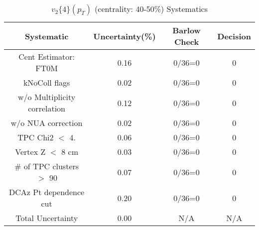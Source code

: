 \begin{table}[htbp]
\caption{$v_2\{4\}(p_{T})$ (centrality: 40-50\%) Systematics}
\label{tab:Sys_pTDiffv24ChFull}
\centering
\begin{tabular}{|c|c|c|c|}
\hline
Systematic & Uncertainty(\%) & Barlow Check & Decision \\
\hline
Cent Estimator: FT0M & 0.16 & 0/36=0 & 0 \\
kNoColl flags & 0.02 & 0/36=0 & 0 \\
w/o Multiplicity correlation & 0.12 & 0/36=0 & 0 \\
w/o NUA correction & 0.02 & 0/36=0 & 0 \\
TPC Chi2 $<$ 4. & 0.06 & 0/36=0 & 0 \\
Vertex Z $<$ 8 cm & 0.03 & 0/36=0 & 0 \\
\# of TPC clusters $>$ 90 & 0.07 & 0/36=0 & 0 \\
DCAz Pt dependence cut & 0.20 & 0/36=0 & 0 \\
\hline
Total Uncertainty & 0.00 & N/A & N/A \\
\hline
\end{tabular}
\end{table}
